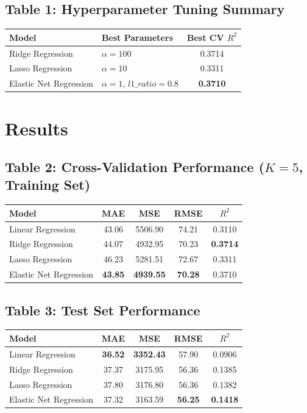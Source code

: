 \documentclass[12pt,a4paper]{article}
\begin{document}
\subsection*{Table 1: Hyperparameter Tuning Summary}
\begin{tabular}{llc}
\toprule
Model & Best Parameters & Best CV $R^2$ \\
\midrule
Ridge Regression & $\alpha=100$ & 0.3714 \\
Lasso Regression & $\alpha=10$ & 0.3311 \\
Elastic Net Regression & $\alpha=1$, $l1\_ratio=0.8$ & \textbf{0.3710} \\
\bottomrule
\end{tabular}

\section{Results}

\subsection*{Table 2: Cross-Validation Performance ($K=5$, Training Set)}
\begin{tabular}{lcccc}
\toprule
Model & MAE & MSE & RMSE & $R^2$ \\
\midrule
Linear Regression & 43.06 & 5506.90 & 74.21 & 0.3110 \\
Ridge Regression & 44.07 & 4932.95 & 70.23 & \textbf{0.3714} \\
Lasso Regression & 46.23 & 5281.51 & 72.67 & 0.3311 \\
Elastic Net Regression & \textbf{43.85} & \textbf{4939.55} & \textbf{70.28} & 0.3710 \\
\bottomrule
\end{tabular}

\subsection*{Table 3: Test Set Performance}
\begin{tabular}{lcccc}
\toprule
Model & MAE & MSE & RMSE & $R^2$ \\
\midrule
Linear Regression & \textbf{36.52} & \textbf{3352.43} & 57.90 & 0.0906 \\
Ridge Regression & 37.37 & 3175.95 & 56.36 & 0.1385 \\
Lasso Regression & 37.80 & 3176.80 & 56.36 & 0.1382 \\
Elastic Net Regression & 37.32 & 3163.59 & \textbf{56.25} & \textbf{0.1418} \\
\bottomrule
\end{tabular}
\end{document}
